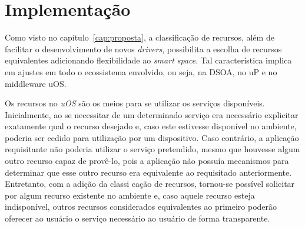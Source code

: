 \chapter{Implementação}

Como visto no capítulo~\ref{cap:proposta}, a classificação de recursos, além de facilitar o desenvolvimento de novos \emph{drivers}, possibilita a escolha de recursos equivalentes adicionando flexibilidade ao \emph{smart space}. Tal característica implica em ajustes em todo o ecossistema envolvido, ou seja, na DSOA, no uP e no middleware uOS.

Os recursos no \emph{uOS} são os meios para se utilizar os serviços disponíveis. Inicialmente, ao se necessitar de um determinado serviço era necessário explicitar exatamente qual o recurso desejado e, caso este estivesse disponível no ambiente, poderia ser cedido para utilização por um dispositivo. Caso contrário, a aplicação requisitante não poderia utilizar o serviço pretendido, mesmo que houvesse algum outro recurso capaz de provê-lo, pois a aplicação não possuía mecanismos para determinar que esse outro recurso era equivalente ao requisitado anteriormente. Entretanto, com a adição da classi cação de recursos, tornou-se possível solicitar por algum recurso existente no ambiente e, caso aquele recurso esteja indisponível, outros recursos considerados equivalentes ao primeiro poderão oferecer ao usuário o serviço necessário ao usuário de forma transparente.



